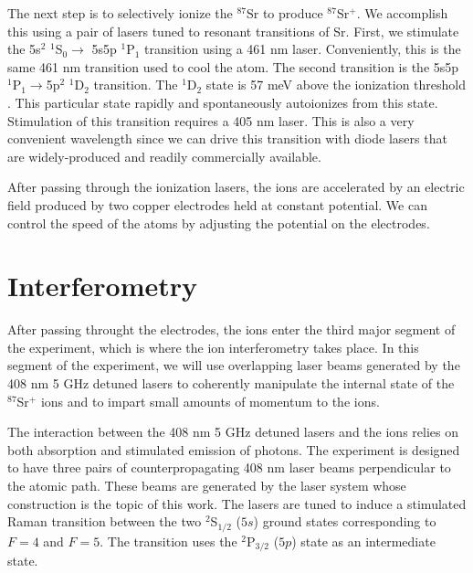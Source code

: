 The next step is to selectively ionize the $^{87}$Sr to produce $^{87}$Sr$^+$. We accomplish this using a pair of lasers tuned to resonant transitions of Sr. First, we stimulate the 5s$^2$ $^1$S$_0 \rightarrow$ 5s5p $^1$P$_1$ transition using a 461 nm laser. Conveniently, this is the same 461 nm transition used to cool the atom. The second transition is the 5s5p $^1$P$_1\rightarrow$5p$^2$ $^1$D$_2$ transition. The $^1$D$_2$ state is 57 meV above the ionization threshold \cite{NSFprop}. This particular state rapidly and spontaneously autoionizes from this state. Stimulation of this transition requires a 405 nm laser. This is also a very convenient wavelength since we can drive this transition with diode lasers that are widely-produced and readily commercially available.

After passing through the ionization lasers, the ions are accelerated by an electric field produced by two copper electrodes held at constant potential. We can control the speed of the atoms by adjusting the potential on the electrodes.%

\section{Interferometry}

After passing throught the electrodes, the ions enter the third major segment of the experiment, which is where the ion interferometry takes place. In this segment of the experiment, we will use overlapping laser beams generated by the 408 nm 5 GHz detuned lasers to coherently manipulate the internal state of the $^{87}$Sr$^+$ ions and to impart small amounts of momentum to the ions. 

The interaction between the 408 nm 5 GHz detuned lasers and the ions relies on both absorption and stimulated emission of photons. The experiment is designed to have three pairs of counterpropagating 408 nm laser beams perpendicular to the atomic path. These beams are generated by the laser system whose construction is the topic of this work.  The lasers are tuned to induce a stimulated Raman transition between the two $^2$S$_{1/2}$ ($5s$) ground states corresponding to $F=4$ and $F=5$. The transition uses the $^2$P$_{3/2}$ ($5p$) state as an intermediate state.

